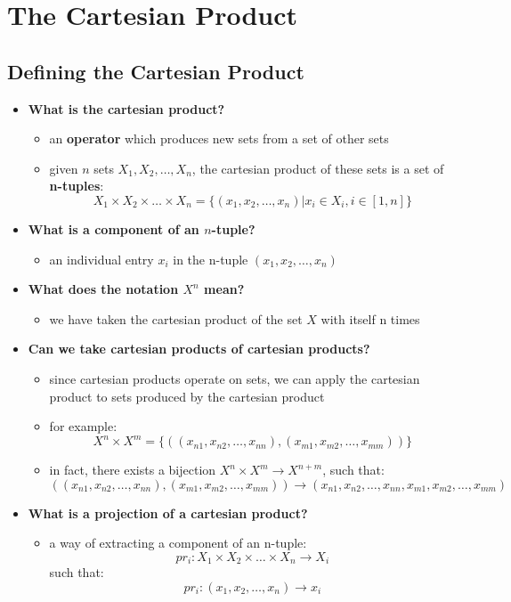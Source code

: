 \documentclass{exam}
\begin{document}
\section{The Cartesian Product}

\subsection{Defining the Cartesian Product}

\begin{itemize}
    \item \textbf{What is the cartesian product?}
    \begin{itemize}
        \item an \textbf{operator} which produces new sets from a set of other sets
        \item given $n$ sets $X_1, X_2, \ldots, X_n$, the cartesian product of these sets is a set of \textbf{n-tuples}:
        \[
        X_1 \times X_2 \times \ldots \times X_n = \{(x_1, x_2, \ldots, x_n) | x_i \in X_i, i \in [1,n]\}
        \]
    \end{itemize}
    \item \textbf{What is a component of an $n$-tuple?}
    \begin{itemize}
        \item an individual entry $x_i$ in the n-tuple $(x_1, x_2, \ldots, x_n)$
    \end{itemize}
    \item \textbf{What does the notation $X^n$ mean?}
    \begin{itemize}
        \item we have taken the cartesian product of the set $X$ with itself n times
    \end{itemize}
    \item \textbf{Can we take cartesian products of cartesian products?}
    \begin{itemize}
        \item since cartesian products operate on sets, we can apply the cartesian product to sets produced by the cartesian product
        \item for example:
        \[
        X^n \times X^m = \{((x_{n1}, x_{n2}, \ldots, x_{nn}), (x_{m1}, x_{m2}, \ldots, x_{mm}))\}
        \]
        \item in fact, there exists a bijection $X^n \times X^m \to X^{n+m}$, such that:
        \[
        ((x_{n1}, x_{n2}, \ldots, x_{nn}), (x_{m1}, x_{m2}, \ldots, x_{mm})) \to (x_{n1}, x_{n2}, \ldots, x_{nn}, x_{m1}, x_{m2}, \ldots, x_{mm})
        \]
    \end{itemize}
    \item \textbf{What is a projection of a cartesian product?}
    \begin{itemize}
        \item a way of extracting a component of an n-tuple:
        \[
        pr_i : X_1 \times X_2 \times \ldots \times X_n \to X_i 
        \]
        such that:
        \[
        pr_i : (x_1, x_2, \ldots, x_n) \to x_i
        \]
    \end{itemize}
\end{itemize}
\end{document}
